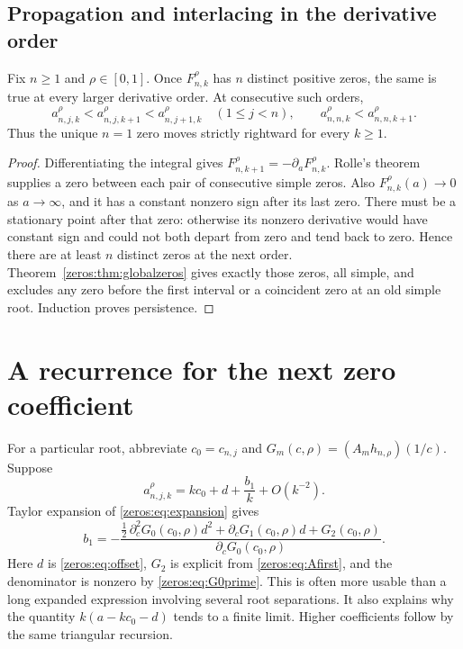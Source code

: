 \subsection{Propagation and interlacing in the derivative order}
\begin{corollary}\label{zeros:cor:interlacing}
Fix $n\geq1$ and $\rho\in[0,1]$. Once $F_{n,k}^{\rho}$ has $n$ distinct positive zeros, the same is true at every larger derivative order. At consecutive such orders,
\begin{equation}\label{zeros:eq:interlacing}
 a_{n,j,k}^{\rho}<a_{n,j,k+1}^{\rho}<a_{n,j+1,k}^{\rho}\quad(1\leq j<n),
 \qquad a_{n,n,k}^{\rho}<a_{n,n,k+1}^{\rho}.
\end{equation}
Thus the unique $n=1$ zero moves strictly rightward for every $k\geq1$.
\end{corollary}
\begin{proof}
Differentiating the integral gives $F_{n,k+1}^{\rho}=-\partial_aF_{n,k}^{\rho}$. Rolle's theorem supplies a zero between each pair of consecutive simple zeros. Also $F_{n,k}^{\rho}(a)\to0$ as $a\to\infty$, and it has a constant nonzero sign after its last zero. There must be a stationary point after that zero: otherwise its nonzero derivative would have constant sign and could not both depart from zero and tend back to zero. Hence there are at least $n$ distinct zeros at the next order. Theorem~\ref{zeros:thm:globalzeros} gives exactly those zeros, all simple, and excludes any zero before the first interval or a coincident zero at an old simple root. Induction proves persistence.
\end{proof}
\section{A recurrence for the next zero coefficient}
\label{zeros:app:nextzero}
For a particular root, abbreviate $c_0=c_{n,j}$ and
$G_m(c,\rho)=(A_mh_{n,\rho})(1/c)$. Suppose
\[
 a_{n,j,k}^{\rho}=kc_0+d+\frac{b_1}{k}+O(k^{-2}).
\]
Taylor expansion of \eqref{zeros:eq:expansion} gives
\begin{equation}\label{zeros:eq:b1}
 b_1=-\frac{\tfrac12\,\partial_c^2G_0(c_0,\rho)d^2
                +\partial_cG_1(c_0,\rho)d+G_2(c_0,\rho)}
               {\partial_cG_0(c_0,\rho)}.
\end{equation}
Here $d$ is \eqref{zeros:eq:offset}, $G_2$ is explicit from \eqref{zeros:eq:Afirst}, and the denominator is nonzero by \eqref{zeros:eq:G0prime}. This is often more usable than a long expanded expression involving several root separations. It also explains why the quantity $k(a-kc_0-d)$ tends to a finite limit. Higher coefficients follow by the same triangular recursion.

